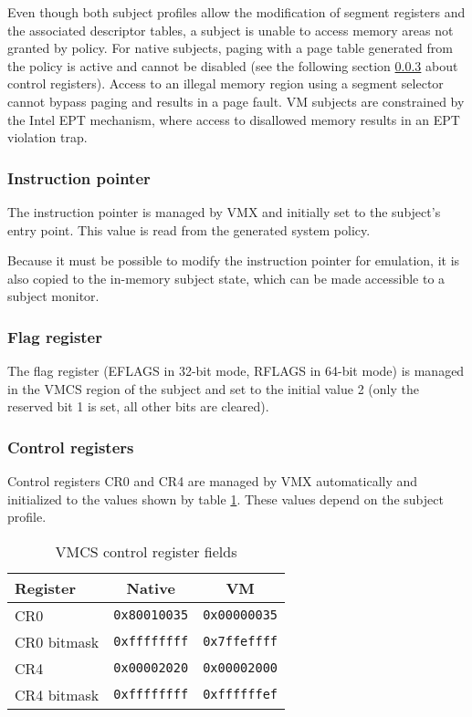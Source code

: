 Even though both subject profiles allow the modification of segment registers
and the associated descriptor tables, a subject is unable to access memory areas
not granted by policy. For native subjects, paging with a page table generated
from the policy is active and cannot be disabled (see the following section
\ref{subsubsec:control-regs} about control registers). Access to an illegal
memory region using a segment selector cannot bypass paging and results in a
page fault. VM subjects are constrained by the Intel EPT mechanism, where
access to disallowed memory results in an EPT violation trap.

\subsubsection{Instruction pointer}
The instruction pointer is managed by VMX and initially set to the subject's
entry point. This value is read from the generated system policy.

Because it must be possible to modify the instruction pointer for emulation, it
is also copied to the in-memory subject state, which can be made accessible to a
subject monitor.

\subsubsection{Flag register}
The flag register (EFLAGS in 32-bit mode, RFLAGS in 64-bit mode) is managed in
the VMCS region of the subject and set to the initial value 2 (only the reserved
bit 1 is set, all other bits are cleared).

\subsubsection{Control registers}\label{subsubsec:control-regs}
Control registers CR0 and CR4 are managed by VMX automatically and initialized
to the values shown by table \ref{tab:vmcs-control-regs}. These values depend
on the subject profile.

\begin{table}[h]
	\centering
	\begin{tabular}{l|c|c}
		\textbf{Register} & \textbf{Native} & \textbf{VM} \\
		\hline
		CR0 & \texttt{0x80010035} & \texttt{0x00000035} \\
		CR0 bitmask & \texttt{0xffffffff} & \texttt{0x7ffeffff} \\
		CR4 & \texttt{0x00002020} & \texttt{0x00002000} \\
		CR4 bitmask & \texttt{0xffffffff} & \texttt{0xffffffef} \\
	\end{tabular}
	\caption{VMCS control register fields}
	\label{tab:vmcs-control-regs}
\end{table}

